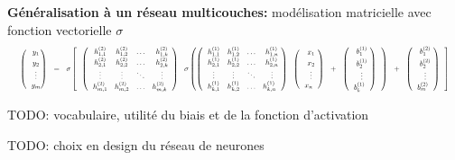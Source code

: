 \documentclass[10pt]{beamer}
\begin{document}
\begin{frame}
\begin{columns}[T]
\begin{column}{0.70\textwidth}
\vspace{0.5cm}
\textbf{Généralisation à un réseau multicouches:} modélisation matricielle avec fonction vectorielle $\sigma$
\begin{equation*}
\resizebox{\textwidth}{!}{
$\begin{pmatrix}
  y_{1} \\[0.3em]
  y_{2} \\
  \vdots \\
  y_{m}
\end{pmatrix}
  =
  \sigma\left[
  \begin{pmatrix}
  h^{(2)}_{1,1} & h^{(2)}_{1,2} & \ldots & h^{(2)}_{1,k} \\
  h^{(2)}_{2,1} & h^{(2)}_{2,2} & \ldots & h^{(2)}_{2,k} \\
  \vdots & \vdots & \ddots & \vdots \\
  h^{(2)}_{m,1} & h^{(2)}_{m,2} & \ldots & h^{(2)}_{m,k}
  \end{pmatrix}
  \sigma\left(
\begin{pmatrix}
  h^{(1)}_{1,1} & h^{(1)}_{1,2} & \ldots & h^{(1)}_{1,n} \\
  h^{(1)}_{2,1} & h^{(1)}_{2,2} & \ldots & h^{(1)}_{2,n} \\
  \vdots & \vdots & \ddots & \vdots \\
  h^{(1)}_{k,1} & h^{(1)}_{k,2} & \ldots & h^{(1)}_{k,n}
  \end{pmatrix}
  \begin{pmatrix}
  x_{1} \\[0.3em]
  x_{2} \\
  \vdots \\
  x_{n}
  \end{pmatrix}
  +
  \begin{pmatrix}
  b_{1}^{(1)} \\[0.3em]
  b_{2}^{(1)} \\
  \vdots \\
  b_{k}^{(1)}
  \end{pmatrix}
  \right)
  +
  \begin{pmatrix}
  b_{1}^{(2)} \\[0.3em]
  b_{2}^{(2)} \\
  \vdots \\
  b_{m}^{(2)}
  \end{pmatrix}
  \right] 
$}
\end{equation*}

TODO: vocabulaire, utilité du biais et de la fonction d'activation

TODO: choix en design du réseau de neurones 


\end{column}
\end{columns}
\end{frame}
\end{document}
